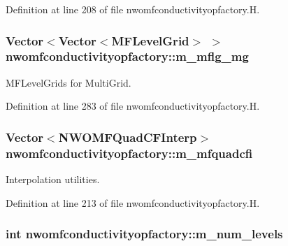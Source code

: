 Definition at line 208 of file nwomfconductivityopfactory.\+H.

\subsubsection[{\texorpdfstring{m\+\_\+mflg\+\_\+mg}{m_mflg_mg}}]{\setlength{\rightskip}{0pt plus 5cm}Vector$<$Vector$<${\bf M\+F\+Level\+Grid}$>$ $>$ nwomfconductivityopfactory\+::m\+\_\+mflg\+\_\+mg\hspace{0.3cm}{\ttfamily [protected]}}\hypertarget{classnwomfconductivityopfactory_a36ef39139654ba4b80857d598e9a7bba}{}\label{classnwomfconductivityopfactory_a36ef39139654ba4b80857d598e9a7bba}


M\+F\+Level\+Grids for Multi\+Grid. 



Definition at line 283 of file nwomfconductivityopfactory.\+H.

\subsubsection[{\texorpdfstring{m\+\_\+mfquadcfi}{m_mfquadcfi}}]{\setlength{\rightskip}{0pt plus 5cm}Vector$<${\bf N\+W\+O\+M\+F\+Quad\+C\+F\+Interp}$>$ nwomfconductivityopfactory\+::m\+\_\+mfquadcfi\hspace{0.3cm}{\ttfamily [protected]}}\hypertarget{classnwomfconductivityopfactory_ae5ecd6c1c043b72f9f69bb0fe644cc81}{}\label{classnwomfconductivityopfactory_ae5ecd6c1c043b72f9f69bb0fe644cc81}


Interpolation utilities. 



Definition at line 213 of file nwomfconductivityopfactory.\+H.

\subsubsection[{\texorpdfstring{m\+\_\+num\+\_\+levels}{m_num_levels}}]{\setlength{\rightskip}{0pt plus 5cm}int nwomfconductivityopfactory\+::m\+\_\+num\+\_\+levels\hspace{0.3cm}{\ttfamily [protected]}}\hypertarget{classnwomfconductivityopfactory_afe02ccd11418bf08c2a5dbf6bfd1842e}{}\label{classnwomfconductivityopfactory_afe02ccd11418bf08c2a5dbf6bfd1842e}


